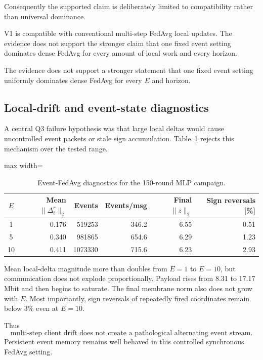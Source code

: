 Consequently the supported claim is deliberately limited to compatibility rather than universal dominance.
\begin{takeawaybox}[title={Q3 compatibility conclusion}]
V1 is compatible with conventional multi-step FedAvg local updates. The evidence does not support the stronger claim that one fixed event setting dominates dense FedAvg for every amount of local work and every horizon.
\end{takeawaybox}
The evidence does not support a stronger statement that one fixed event setting uniformly dominates dense FedAvg for every $E$ and horizon.

\subsection{Local-drift and event-state diagnostics}

A central Q3 failure hypothesis was that large local deltas would cause uncontrolled event packets or stale sign accumulation. Table~\ref{tab:q3-diagnostics} rejects this mechanism over the tested range.

\begin{table}[ht]
\centering
\small
\caption{Event-FedAvg diagnostics for the 150-round MLP campaign.}
\label{tab:q3-diagnostics}
\begin{adjustbox}{max width=\textwidth}
\begin{tabular}{crrrrr}
\toprule
$E$ & Mean $\|\Delta_i^r\|_2$ & Events & Events/msg & Final $\|z\|_2$ & Sign reversals [\%]\\
\midrule
1 & 0.176 & 519253 & 346.2 & 6.55 & 0.51\\
5 & 0.340 & 981865 & 654.6 & 6.29 & 1.23\\
10 & 0.411 & 1073330 & 715.6 & 6.23 & 2.93\\
\bottomrule
\end{tabular}
\end{adjustbox}
\end{table}

Mean local-delta magnitude more than doubles from $E=1$ to $E=10$, but communication does not explode proportionally. Payload rises from 8.31 to 17.17 Mbit and then begins to saturate. The final membrane norm also does not grow with $E$. Most importantly, sign reversals of repeatedly fired coordinates remain below 3\% even at $E=10$.

Thus
\begin{equation}
\boxed{
\text{multi-step client drift does not create a pathological alternating event stream.}
}
\end{equation}
Persistent event memory remains well behaved in this controlled synchronous FedAvg setting.

